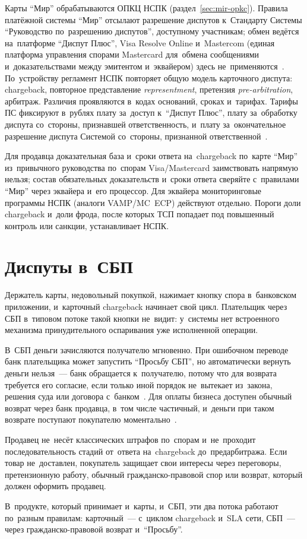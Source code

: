 Карты \enquote{Мир} обрабатываются ОПКЦ НСПК (раздел~\ref{sec:mir-opkc}).
Правила платёжной системы \enquote{Мир} отсылают разрешение диспутов
к~Стандарту Системы \enquote{Руководство по~разрешению диспутов}, доступному
участникам; обмен ведётся на~платформе \enquote{Диспут Плюс}, Visa Resolve
Online и~Mastercom (единая платформа управления спорами Mastercard для~обмена
сообщениями и~доказательствами между эмитентом и~эквайером) здесь
не~применяются~\cite{nspk-mir-rules-v43}. По~устройству регламент НСПК
повторяет общую модель карточного диспута: chargeback,
повторное представление \textit{representment}, претензия
\textit{pre-arbitration}, арбитраж. Различия проявляются в~кодах оснований,
сроках и~тарифах. Тарифы ПС фиксируют в~рублях плату за~доступ
к~\enquote{Диспут Плюс}, плату за~обработку диспута со~стороны, признавшей
ответственность, и~плату за~окончательное разрешение диспута Системой
со~стороны, признанной ответственной~\cite{nspk-mir-tariffs}.

Для продавца доказательная база и~сроки ответа на~chargeback по~карте
\enquote{Мир} из~привычного руководства по~спорам Visa/Mastercard заимствовать
напрямую нельзя; состав обязательных доказательств и~сроки ответа сверяйте
с~правилами \enquote{Мир} через эквайера и~его процессор. Для эквайера
мониторинговые программы НСПК (аналоги VAMP/MC~ECP) действуют отдельно. Пороги
доли chargeback и~доли фрода, после которых ТСП
попадает под повышенный контроль или санкции, устанавливает НСПК.

\section{Диспуты в~СБП}\label{sec:disputes-sbp}

Держатель карты, недовольный покупкой, нажимает кнопку спора в~банковском
приложении, и~карточный chargeback начинает свой цикл. Плательщик через
СБП в~типовом потоке такой кнопки не~видит: у~системы нет встроенного механизма
принудительного оспаривания уже исполненной операции.

В~СБП деньги зачисляются получателю мгновенно. При ошибочном переводе банк
плательщика может запустить \enquote{Просьбу СБП}, но автоматически вернуть
деньги нельзя~--- банк обращается к~получателю, потому что для возврата
требуется его согласие, если только иной порядок не~вытекает из~закона, решения
суда или договора с~банком~\cite{cbr-sbp-faq-mistaken-transfer}. Для оплаты
бизнеса доступен обычный возврат через банк продавца, в~том числе частичный,
и~деньги при таком возврате поступают покупателю
моментально~\cite{sbp-faq-business}.

Продавец не~несёт классических штрафов по~спорам и~не~проходит
последовательность стадий от~ответа на~chargeback до~предарбитража. Если товар не~доставлен, покупатель защищает свои интересы через переговоры,
претензионную работу, обычный гражданско-правовой спор или возврат, который
должен оформить продавец.

В~продукте, который принимает и~карты, и~СБП, эти два потока работают по~разным
правилам: карточный~--- с~циклом chargeback и~SLA сети, СБП~---
через гражданско-правовой возврат и~\enquote{Просьбу}.
